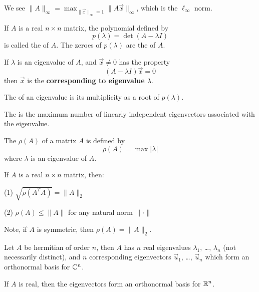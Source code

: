 \begin{ex}
We see
$\|A\|_{\infty}=\max_{\|\vec{x}\|_{\infty}=1}\|A\vec{x}\|_{\infty}$,
which is the $\ell_{\infty}$ norm.
\end{ex}

\begin{defn}
If $A$ is a real $n\times n$ matrix, the polynomial defined by
\begin{equation}
p(\lambda)=\det(A-\lambda I)
\end{equation}
is called the  of $A$. The zeroes of
$p(\lambda)$ are the  of $A$. 

If $\lambda$ is an eigenvalue of $A$, and $\vec{x}\neq0$ has the
property
\begin{equation}
(A-\lambda I)\vec{x}=0
\end{equation}
then $\vec{x}$ is the  \textbf{corresponding to
  eigenvalue $\lambda$}.

The  of an eigenvalue is its multiplicity
as a root of $p(\lambda)$.

The  is the maximum number of linearly
independent eigenvectors associated with the eigenvalue.
\end{defn}
\begin{defn}
The  $\rho(A)$ of a matrix $A$ is defined by
\begin{equation}
\rho(A)=\max|\lambda|
\end{equation}
where $\lambda$ is an eigenvalue of $A$.
\end{defn}
\begin{thm}
If $A$ is a real $n\times n$ matrix, then:

(1) $\sqrt{\rho(A^{T}A)}=\|A\|_{2}$

(2) $\rho(A)\leq \|A\|$ for any natural norm $\|\cdot\|$
\end{thm}

Note, if $A$ is symmetric, then $\rho(A)=\|A\|_{2}$.

\begin{thm}
Let $A$ be hermitian of order $n$, then $A$ has $n$ real eigenvalues
$\lambda_1$, \dots, $\lambda_n$ (not necessarily distinct), and $n$
corresponding eigenvectors $\vec{u}_1$, \dots, $\vec{u}_n$ which form an
orthonormal basis for $\mathbb{C}^n$.

If $A$ is real, then the eigenvectors form an orthonormal basis for $\mathbb{R}^n$.
\end{thm}
